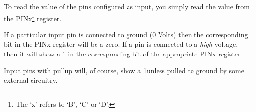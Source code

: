 To read the value of the pins configured as input, you simply read the value from the PINx\footnote{The `x' refers to `B', `C' or `D'.} register.

If a particular input pin is connected to ground (0 Volts) then the corresponding bit in the PINx register will be a zero. If a pin is connected to a \emph{high} voltage, then it will show a 1 in the corresponding bit of the appropriate PINx register.

Input pins with pullup will, of course, show a 1unless pulled to ground by some external circuitry.




